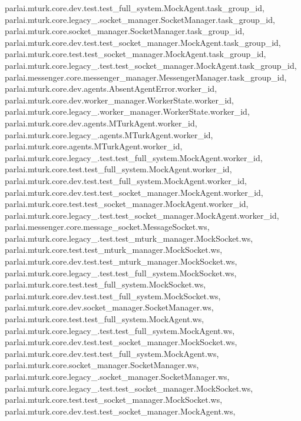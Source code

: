 parlai.\+mturk.\+core.\+dev.\+test.\+test\+\_\+full\+\_\+system.\+Mock\+Agent.\+task\+\_\+group\+\_\+id, parlai.\+mturk.\+core.\+legacy\+\_.\+socket\+\_\+manager.\+Socket\+Manager.\+task\+\_\+group\+\_\+id, parlai.\+mturk.\+core.\+socket\+\_\+manager.\+Socket\+Manager.\+task\+\_\+group\+\_\+id, parlai.\+mturk.\+core.\+dev.\+test.\+test\+\_\+socket\+\_\+manager.\+Mock\+Agent.\+task\+\_\+group\+\_\+id, parlai.\+mturk.\+core.\+test.\+test\+\_\+socket\+\_\+manager.\+Mock\+Agent.\+task\+\_\+group\+\_\+id, parlai.\+mturk.\+core.\+legacy\+\_.\+test.\+test\+\_\+socket\+\_\+manager.\+Mock\+Agent.\+task\+\_\+group\+\_\+id, parlai.\+messenger.\+core.\+messenger\+\_\+manager.\+Messenger\+Manager.\+task\+\_\+group\+\_\+id, parlai.\+mturk.\+core.\+dev.\+agents.\+Absent\+Agent\+Error.\+worker\+\_\+id, parlai.\+mturk.\+core.\+dev.\+worker\+\_\+manager.\+Worker\+State.\+worker\+\_\+id, parlai.\+mturk.\+core.\+legacy\+\_.\+worker\+\_\+manager.\+Worker\+State.\+worker\+\_\+id, parlai.\+mturk.\+core.\+dev.\+agents.\+M\+Turk\+Agent.\+worker\+\_\+id, parlai.\+mturk.\+core.\+legacy\+\_.\+agents.\+M\+Turk\+Agent.\+worker\+\_\+id, parlai.\+mturk.\+core.\+agents.\+M\+Turk\+Agent.\+worker\+\_\+id, parlai.\+mturk.\+core.\+legacy\+\_.\+test.\+test\+\_\+full\+\_\+system.\+Mock\+Agent.\+worker\+\_\+id, parlai.\+mturk.\+core.\+test.\+test\+\_\+full\+\_\+system.\+Mock\+Agent.\+worker\+\_\+id, parlai.\+mturk.\+core.\+dev.\+test.\+test\+\_\+full\+\_\+system.\+Mock\+Agent.\+worker\+\_\+id, parlai.\+mturk.\+core.\+dev.\+test.\+test\+\_\+socket\+\_\+manager.\+Mock\+Agent.\+worker\+\_\+id, parlai.\+mturk.\+core.\+test.\+test\+\_\+socket\+\_\+manager.\+Mock\+Agent.\+worker\+\_\+id, parlai.\+mturk.\+core.\+legacy\+\_.\+test.\+test\+\_\+socket\+\_\+manager.\+Mock\+Agent.\+worker\+\_\+id, parlai.\+messenger.\+core.\+message\+\_\+socket.\+Message\+Socket.\+ws, parlai.\+mturk.\+core.\+legacy\+\_.\+test.\+test\+\_\+mturk\+\_\+manager.\+Mock\+Socket.\+ws, parlai.\+mturk.\+core.\+test.\+test\+\_\+mturk\+\_\+manager.\+Mock\+Socket.\+ws, parlai.\+mturk.\+core.\+dev.\+test.\+test\+\_\+mturk\+\_\+manager.\+Mock\+Socket.\+ws, parlai.\+mturk.\+core.\+legacy\+\_.\+test.\+test\+\_\+full\+\_\+system.\+Mock\+Socket.\+ws, parlai.\+mturk.\+core.\+test.\+test\+\_\+full\+\_\+system.\+Mock\+Socket.\+ws, parlai.\+mturk.\+core.\+dev.\+test.\+test\+\_\+full\+\_\+system.\+Mock\+Socket.\+ws, parlai.\+mturk.\+core.\+dev.\+socket\+\_\+manager.\+Socket\+Manager.\+ws, parlai.\+mturk.\+core.\+test.\+test\+\_\+full\+\_\+system.\+Mock\+Agent.\+ws, parlai.\+mturk.\+core.\+legacy\+\_.\+test.\+test\+\_\+full\+\_\+system.\+Mock\+Agent.\+ws, parlai.\+mturk.\+core.\+dev.\+test.\+test\+\_\+socket\+\_\+manager.\+Mock\+Socket.\+ws, parlai.\+mturk.\+core.\+dev.\+test.\+test\+\_\+full\+\_\+system.\+Mock\+Agent.\+ws, parlai.\+mturk.\+core.\+socket\+\_\+manager.\+Socket\+Manager.\+ws, parlai.\+mturk.\+core.\+legacy\+\_.\+socket\+\_\+manager.\+Socket\+Manager.\+ws, parlai.\+mturk.\+core.\+legacy\+\_.\+test.\+test\+\_\+socket\+\_\+manager.\+Mock\+Socket.\+ws, parlai.\+mturk.\+core.\+test.\+test\+\_\+socket\+\_\+manager.\+Mock\+Socket.\+ws, parlai.\+mturk.\+core.\+dev.\+test.\+test\+\_\+socket\+\_\+manager.\+Mock\+Agent.\+ws, 
